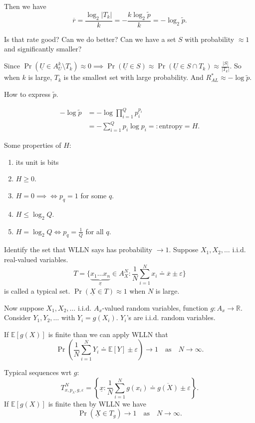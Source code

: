 \documentclass{report}
\newcommand{\R}{\mathbb{R}}
\newcommand{\matE}{\mathbb{E}}
\newcommand{\eqdef}{=\mathrel{\mathop:}}
\theoremstyle{definition}
\theoremstyle{remark}
\numberwithin{equation}{section}
\begin{document}
Then we have \[
  \overline{r} = \frac{\log_2|T_k|}{k} = -\frac{k\log_2\tilde{p}}{k} = -\log_2\tilde{p}. 
\]

Is that rate good? Can we do better? Can we have a set $S$ with probability $\approx 1$ and significantly smaller?

Since $\Pr(\underline{U} \in A^k_U \setminus T_k) \approx 0 \implies \Pr(\underline{U} \in S) \approx \Pr(\underline{U} \in S \cap T_k) \approx \frac{|S|}{|T_k|}$. So when $k$ is large, $T_k$ is the smallest set with large probability. And $R^*_{AL} \approx -\log \tilde{p}$.

How to express $\tilde{p}$.

\begin{align*}
  -\log \tilde{p} & = -\log \prod_{i=1}^Q p_i^{p_i} \\
  & = -\sum_{i=1}^Q p_i\log p_i \eqdef \text{entropy} = H.
\end{align*}

Some properties of $H$:
\begin{enumerate}
  \item its unit is bits
  \item $H \geq 0$.
  \item $H = 0 \implies \iff p_q = 1$ for some $q$.
  \item $H \leq \log_2 Q$.
  \item $H = \log_2 Q \iff p_q = \frac{1}{Q}$ for all $q$.
\end{enumerate}


Identify the set that WLLN says has probability $\to 1$. Suppose $X_1, X_2, \ldots$ i.i.d. real-valued variables. \[
  T = \{\underbrace{x_1 \ldots x_n}_{\underline{x}} \in A_X^N: \frac{1}{N}\sum_{i=1}^N x_i \doteq \overline{x} \pm \varepsilon\}  
\] is called a typical set. $\Pr(\underline{X} \in T) \approx 1$ when $N$ is large.

Now suppose $X_1, X_2, \ldots$ i.i.d. $A_x$-valued random variables, function $g: A_x \to \R$. Consider $Y_1, Y_2, \ldots$ with $Y_i = g(X_i)$. $Y_i$'s are i.i.d. random variables. 

If $\matE[g(X)]$ is finite than we can apply WLLN that \[
  \Pr\left(\frac{1}{N}\sum_{i=1}^{N} Y_i \doteq \matE[Y] \pm \varepsilon\right) \to 1 \quad \text{as} \quad N \to \infty.
\]

Typical sequences wrt $g$: \[
  T^N_{x, p_\lambda, g, \varepsilon} = \left\lbrace\underline{x}: \frac{1}{N}\sum_{i=1}^N g(x_i) \doteq \overline{g(X)} \pm \varepsilon\right\rbrace. 
\]
If $\matE[g(X)]$ is finite then by WLLN we have \[
  \Pr(\underline{X} \in T_g) \to 1 \quad \text{as} \quad N \to \infty.  
\]
\end{document}
